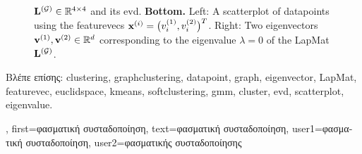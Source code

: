 {{\begin{figure}[H]
\begin{center}
{					${\bf L}^{(\mathcal{G})}  \in \mathbb{R}^{4 \times 4}$ and its \gls{evd}. 
					{\bf Bottom.} Left: A \gls{scatterplot} of \gls{datapoint}s using the \gls{featurevec}s 
					${\bf x}^{(i)} = \big( v^{(1)}_{i},v^{(2)}_{i} \big)^{T}$. 
					Right: Two \gls{eigenvector}s ${\bf v}^{(1)},{\bf v}^{(2)} \in \mathbb{R}^{d}$ 
					corresponding to the \gls{eigenvalue} $\lambda=0$ of the \gls{LapMat} ${\bf L}^{(\mathcal{G})}$. 
					} 
			\end{center}
		\end{figure}
	\newpage
	\foreignlanguage{greek}{Βλέπε επίσης:} \gls{clustering}, \gls{graphclustering}, \gls{datapoint}, \gls{graph}, \gls{eigenvector}, \gls{LapMat}, \gls{featurevec}, \gls{euclidspace}, \gls{kmeans}, \gls{softclustering}, \gls{gmm}, \gls{cluster}, \gls{evd}, \gls{scatterplot}, \gls{eigenvalue}.}, 
	first={\foreignlanguage{greek}{φασματική συσταδοποίηση}},
	text={\foreignlanguage{greek}{φασματική συσταδοποίηση}},
	user1={\foreignlanguage{greek}{φασματική συσταδοποίηση}}, %
    	user2={\foreignlanguage{greek}{φασματικής συσταδοποίησης}} %
}


